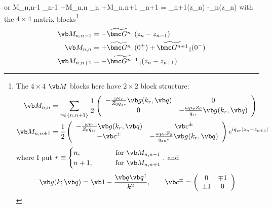 \documentclass[letterpaper]{article}
\renewcommand{\wt}{\widetilde}
\begin{document}
or
{
  \vb M_{n,n-1}  \cdot \wt{\bmc S}_{n-1}
 +\vb M_{n,n}    \cdot \wt{\bmc S}_{n}
 +\vb M_{n,n+1}  \cdot \wt{\bmc S}_{n+1}
 =  \wt{\bmc F}_{n+1\parallel}(z_n)
   -\wt{\bmc F}_{n\parallel}(z_n)
}
with the $4\times 4$ matrix blocks\footnote{The $4\times 4$ $\vb M$
blocks here have $2\times 2$ block structure:
\begin{align}
 \vb M_{n, n}
   &= \sum_{r\in \{n, n+1\}}
     \frac{1}{2}
     \left(\begin{array}{cc}
     -\frac{\omega\epsilon_r}{Z_0 q_{zr}}\vb g(k_r, \vb q)
   & 0
 \\
     0
   & -\frac{\omega\mu_r Z_0 }{q_{zr}}\vb g(k_r, \vb q)
   \end{array}\right)
\\
 \vb M_{n, n \pm 1}
   &= \frac{1}{2}
     \left(\begin{array}{cc}
     -\frac{\omega\epsilon_r}{Z_0 q_{zr}}\vb g(k_r, \vb q)
   & \vb c^\pm
 \\
     -\vb  c^\pm
   & -\frac{\omega\mu_r Z_0 }{q_{zn^*}}\vb g(k_r, \vb q)
     \end{array}\right)e^{iq_{zr}|z_n-z_{n\pm 1}|}
\end{align}
where I put
$  r \equiv  \begin{cases} n,   \qquad &\text{ for } \vb M_{n,n-1} \\
                           n+1, \qquad &\text{ for } \vb M_{n,n+1}
              \end{cases}.
$
and 
$$ \vb g(k; \vb q) =
   \vb 1 - \frac{\vb q\vb q^\dagger}{k^2},
   \qquad 
   \vb c^\pm
   =\left(\begin{array}{cc} 0 & \mp 1 \\ \pm 1 & 0 \end{array}\right)
$$}
\begin{subequations}
\begin{align}
  \vb M_{n,n-1} &= -\wt{\bmc G^n}_{\parallel}(z_n-z_{n-1}) 
\\
  \vb M_{n,n} &= +\wt{\bmc G^n}_{\parallel}(0^+)
                 +\wt{\bmc G^{n+1}}_{\parallel}(0^-)
\\
  \vb M_{n,n+1} &= -\wt{\bmc G^{n+1}}_{\parallel}(z_n-z_{n+1}) 
\end{align}
\label{MChunks}
\end{subequations}
\end{document}
